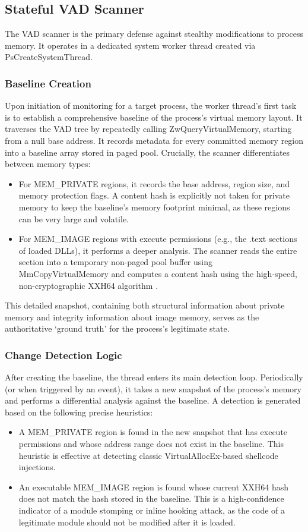 \documentclass[journal]{IEEEtran}
\begin{document}
\subsection{Stateful VAD Scanner}
The VAD scanner is the primary defense against stealthy modifications to process memory. It operates in a dedicated system worker thread created via PsCreateSystemThread.
\subsubsection{Baseline Creation}
Upon initiation of monitoring for a target process, the worker thread's first task is to establish a comprehensive baseline of the process's virtual memory layout. It traverses the VAD tree by repeatedly calling ZwQueryVirtualMemory, starting from a null base address. It records metadata for every committed memory region into a baseline array stored in paged pool. Crucially, the scanner differentiates between memory types:
\begin{itemize}
\item For MEM\_PRIVATE regions, it records the base address, region size, and memory protection flags. A content hash is explicitly not taken for private memory to keep the baseline's memory footprint minimal, as these regions can be very large and volatile.
\item For MEM\_IMAGE regions with execute permissions (e.g., the .text sections of loaded DLLs), it performs a deeper analysis. The scanner reads the entire section into a temporary non-paged pool buffer using MmCopyVirtualMemory and computes a content hash using the high-speed, non-cryptographic XXH64 algorithm \cite{colletXXHash}.
\end{itemize}
This detailed snapshot, containing both structural information about private memory and integrity information about image memory, serves as the authoritative `ground truth' for the process's legitimate state.
\subsubsection{Change Detection Logic}
After creating the baseline, the thread enters its main detection loop. Periodically (or when triggered by an event), it takes a new snapshot of the process's memory and performs a differential analysis against the baseline. A detection is generated based on the following precise heuristics:
\begin{itemize}
\item  A MEM\_PRIVATE region is found in the new snapshot that has execute permissions and whose address range does not exist in the baseline. This heuristic is effective at detecting classic VirtualAllocEx-based shellcode injections.
\item An executable MEM\_IMAGE region is found whose current XXH64 hash does not match the hash stored in the baseline. This is a high-confidence indicator of a module stomping or inline hooking attack, as the code of a legitimate module should not be modified after it is loaded.
\end{itemize}
\end{document}
